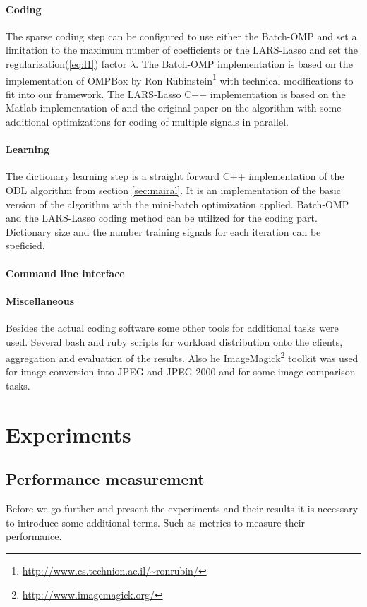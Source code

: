 \paragraph{Coding}
The sparse coding step can be configured to use either the Batch-OMP and 
set a limitation to the maximum number of coefficients or the LARS-Lasso 
and set the regularization(\ref{eq:l1}) factor $\lambda$.
The Batch-OMP implementation is based on the implementation
of OMPBox by Ron
 Rubinstein\footnote{\url{http://www.cs.technion.ac.il/~ronrubin/}} with
technical modifications to fit into our
framework. The LARS-Lasso C++ implementation is based on the Matlab
implementation of\cite{Strand2005} and the original
paper\cite{Efron2004} on the algorithm with some additional optimizations
for coding of multiple signals in parallel. 

\paragraph{Learning}
The dictionary learning step is a straight forward C++ implementation of the
ODL algorithm from section \ref{sec:mairal}. It is an
implementation of the
basic version of the algorithm with the mini-batch optimization applied.
Batch-OMP and the LARS-Lasso coding method can be utilized for the coding part.
Dictionary size and the number training signals for each iteration can be
speficied.

\paragraph{Command line interface}
%

\paragraph{Miscellaneous}
Besides the actual coding software some other tools for
additional tasks were used. Several bash and ruby scripts for workload
distribution onto the clients, aggregation and evaluation of the results.
Also he ImageMagick\footnote{\url{http://www.imagemagick.org/}} toolkit was used
for image conversion into JPEG and JPEG 2000 and for some image comparison
tasks.


\section{Experiments}

\subsection{Performance measurement}
Before we go further and present the experiments and their results  it is
necessary to introduce some additional terms. Such as metrics to measure
their performance.

